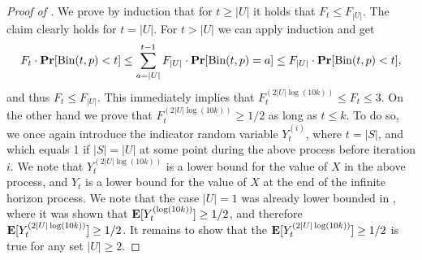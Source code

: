\documentclass[10pt,a4paper]{article}
\theoremstyle{plain}
\theoremstyle{remark}
\theoremstyle{plain}
\renewcommand{\Pr}{\mathop{\bf Pr\/}}
\providecommand{\E}{}
\renewcommand{\E}{\mathop{\bf E\/}}
\newcommand{\Binomial}{\textrm{Bin}}
\begin{document}
\begin{proof}[Proof of ]
We prove by induction that for $t \ge |U|$ it holds that 
$F_t \le F_{|U|}$.
The claim clearly holds for $t=|U|$. For $t> |U|$ we can apply induction and get
$$
F_t\cdot \Pr[\Binomial(t,p)<t] \le  \sum_{a=|U|}^{t-1} F_{|U|} \cdot \Pr[\Binomial(t,p)=a]  \le F_{|U|}\cdot \Pr[\Binomial(t,p)<t],$$
and thus $F_t \le F_{|U|}$. This immediately implies that $F_t^{(2|U|\log(10k))} \leq F_t \leq 3$.
On the other hand we prove that $F_t^{(2|U|\log(10k))} \ge 1/2$ as long as $t\leq k$. To do so, we once again introduce the indicator random variable $Y_t^{(i)}$, where $t = |S|$, and which equals 1 if $|S|=|U|$ at some point during the above process before iteration $i$. We note that $Y_t^{(2|U|\log(10k))}$ is a lower bound for the value of $X$ in the above process, and $Y_t$ is a lower bound for the value of $X$ at the end of the infinite horizon process. We note that the case $|U|=1$ was already lower bounded in , where it was shown that $\E[Y_t^{(\log(10k))}] \ge 1/2$, and therefore $\E[Y_t^{(2|U|\log(10k))}] \ge 1/2$.
It remains to show that the $\E[Y_t^{(2|U|\log(10k))}] \ge 1/2$ is true for any set $|U| \ge 2$.


\end{proof}
\end{document}
